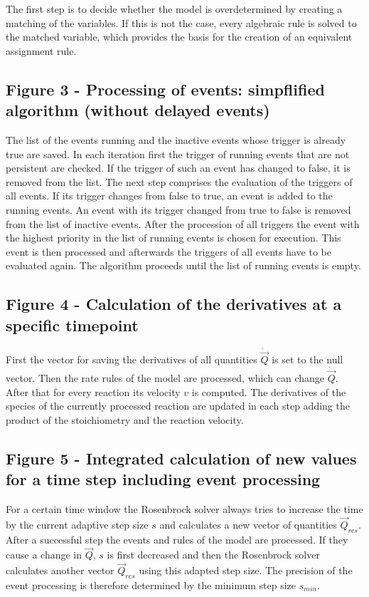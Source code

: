 \documentclass[10pt]{bmc_article}
\newenvironment{bmcformat}{\baselineskip20pt\sloppy\setboolean{publ}{false}}{\baselineskip20pt\sloppy}
\begin{document}
\begin{bmcformat}
The first step is to decide whether the model is overdetermined by creating a matching of the variables. If this is not the case, every algebraic rule is solved to the matched variable, which provides the basis for the creation of an equivalent assignment rule.

 \subsection*{Figure 3 - Processing of events: simpflified algorithm (without delayed events)}

The list of the events running and the inactive events whose trigger is already true are saved. In each iteration first the trigger of running events that are not persistent are checked. If the trigger of such an event has changed to false, it is removed from the list. The next step comprises the evaluation of the triggers of all events. If its trigger changes from false to true, an event is added to the running events. An event with its trigger changed from true to false is removed from the list of inactive events. After the procession of all triggers the event with the highest priority in the list of running events is chosen for execution. This event is then processed and afterwards the triggers of all events have to be evaluated again. The algorithm proceeds until the list of running events is empty.

 \subsection*{Figure 4 - Calculation of the derivatives at a specific timepoint}

First the vector for saving the derivatives of all quantities $\dot{\vec{Q}}$ is set to the null vector. Then the rate rules of the model are processed, which can change $\dot{\vec{Q}}$. After that for every reaction its velocity $v$ is computed. The derivatives of the species of the currently processed reaction are updated in each step adding the product of the stoichiometry and the reaction velocity.

 \subsection*{Figure 5 - Integrated calculation of new values for a time step including event processing}

For a certain time window the Rosenbrock solver always tries to increase the time by the current adaptive step size $s$ and calculates a new vector of quantities $\vec{Q}_{res}$. After a successful step the events and rules of the model are processed. If they cause a change in $\vec{Q}$, $s$ is first decreased and then the Rosenbrock solver calculates another vector $\vec{Q}_{res}$ using this adapted step size. The precision of the event processing is therefore determined by the minimum step size $s_{min}$.


\end{bmcformat}
\end{document}

